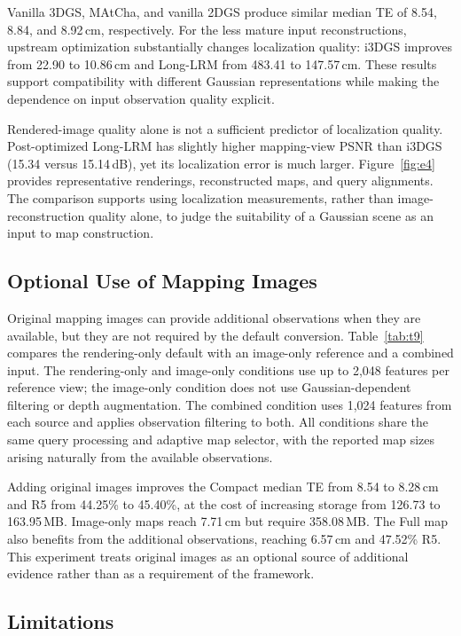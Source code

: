 Vanilla 3DGS, MAtCha, and vanilla 2DGS produce similar median TE of 8.54, 8.84, and 8.92\,cm, respectively. For the less mature input reconstructions, upstream optimization substantially changes localization quality: i3DGS improves from 22.90 to 10.86\,cm and Long-LRM from 483.41 to 147.57\,cm. These results support compatibility with different Gaussian representations while making the dependence on input observation quality explicit.

Rendered-image quality alone is not a sufficient predictor of localization quality. Post-optimized Long-LRM has slightly higher mapping-view PSNR than i3DGS (15.34 versus 15.14\,dB), yet its localization error is much larger. Figure~\ref{fig:e4} provides representative renderings, reconstructed maps, and query alignments. The comparison supports using localization measurements, rather than image-reconstruction quality alone, to judge the suitability of a Gaussian scene as an input to map construction.

\subsection{Optional Use of Mapping Images}
\label{sec:input-availability}


Original mapping images can provide additional observations when they are available, but they are not required by the default conversion. Table~\ref{tab:t9} compares the rendering-only default with an image-only reference and a combined input. The rendering-only and image-only conditions use up to 2,048 features per reference view; the image-only condition does not use Gaussian-dependent filtering or depth augmentation. The combined condition uses 1,024 features from each source and applies observation filtering to both. All conditions share the same query processing and adaptive map selector, with the reported map sizes arising naturally from the available observations.

Adding original images improves the Compact median TE from 8.54 to 8.28\,cm and R5 from 44.25\% to 45.40\%, at the cost of increasing storage from 126.73 to 163.95\,MB. Image-only maps reach 7.71\,cm but require 358.08\,MB. The Full map also benefits from the additional observations, reaching 6.57\,cm and 47.52\% R5. This experiment treats original images as an optional source of additional evidence rather than as a requirement of the framework.

\subsection{Limitations}
\label{sec:limitations}

